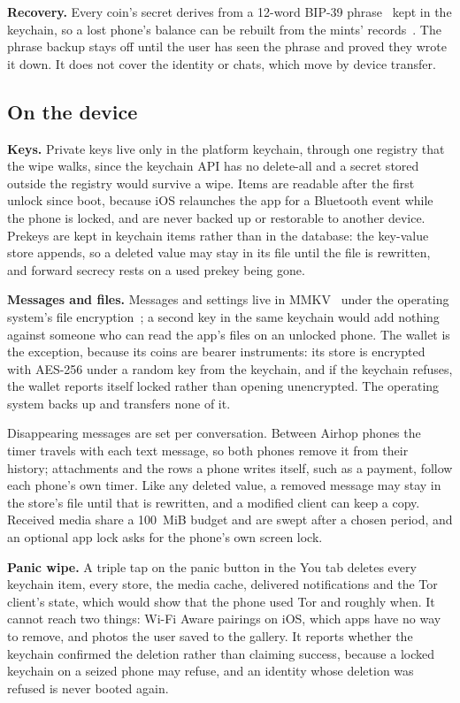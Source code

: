 \documentclass[conference]{IEEEtran}
\begin{document}
\textbf{Recovery.} Every coin's secret derives from a 12-word BIP-39 phrase~\cite{bip39,nut13} kept in the keychain, so a lost phone's balance can be rebuilt from the mints' records~\cite{nut09}. The phrase backup stays off until the user has seen the phrase and proved they wrote it down. It does not cover the identity or chats, which move by device transfer.

\subsection{On the device}
\label{sec:rest}

\textbf{Keys.} Private keys live only in the platform keychain, through one registry that the wipe walks, since the keychain API has no delete-all and a secret stored outside the registry would survive a wipe. Items are readable after the first unlock since boot, because iOS relaunches the app for a Bluetooth event while the phone is locked, and are never backed up or restorable to another device. Prekeys are kept in keychain items rather than in the database: the key-value store appends, so a deleted value may stay in its file until the file is rewritten, and forward secrecy rests on a used prekey being gone.

\textbf{Messages and files.} Messages and settings live in MMKV~\cite{mmkv} under the operating system's file encryption~\cite{appledataprotection,androidfbe}; a second key in the same keychain would add nothing against someone who can read the app's files on an unlocked phone. The wallet is the exception, because its coins are bearer instruments: its store is encrypted with AES-256 under a random key from the keychain, and if the keychain refuses, the wallet reports itself locked rather than opening unencrypted. The operating system backs up and transfers none of it.

Disappearing messages are set per conversation. Between Airhop phones the timer travels with each text message, so both phones remove it from their history; attachments and the rows a phone writes itself, such as a payment, follow each phone's own timer. Like any deleted value, a removed message may stay in the store's file until that is rewritten, and a modified client can keep a copy. Received media share a 100~MiB budget and are swept after a chosen period, and an optional app lock asks for the phone's own screen lock.

\textbf{Panic wipe.} A triple tap on the panic button in the You tab deletes every keychain item, every store, the media cache, delivered notifications and the Tor client's state, which would show that the phone used Tor and roughly when. It cannot reach two things: Wi-Fi Aware pairings on iOS, which apps have no way to remove, and photos the user saved to the gallery. It reports whether the keychain confirmed the deletion rather than claiming success, because a locked keychain on a seized phone may refuse, and an identity whose deletion was refused is never booted again.
\end{document}
